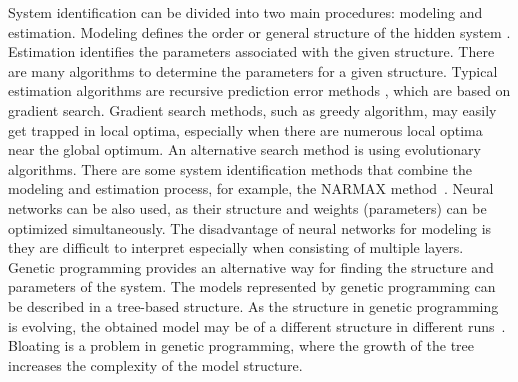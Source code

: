System identification can be divided into two main procedures: modeling and estimation. Modeling defines the order or general structure of the hidden system \cite{Fogel_1991}. Estimation identifies the parameters associated with the given structure. There are many algorithms to determine the parameters for a given structure. Typical estimation algorithms are recursive prediction error methods \cite{Ljungquist1993}, which are based on gradient search. Gradient search methods, such as greedy algorithm, may easily get trapped in local optima, especially when there are numerous local optima near the global optimum. An alternative search method is using evolutionary algorithms. There are some system identification methods that combine the modeling and estimation process, for example, the NARMAX method~\cite{Billings2013}. Neural networks can be also used, as their structure and weights (parameters) can be optimized simultaneously. The disadvantage of neural networks for modeling is they are difficult to interpret especially when consisting of multiple layers. Genetic programming provides an alternative way for finding the structure and parameters of the system. The models represented by genetic programming can be described in a tree-based structure. As the structure in genetic programming is evolving, the obtained model may be of a different structure in different runs~\cite{Vladislavleva:2009}. Bloating \cite{Eiben2003} is a problem in genetic programming, where the growth of the tree increases the complexity of the model structure. 


